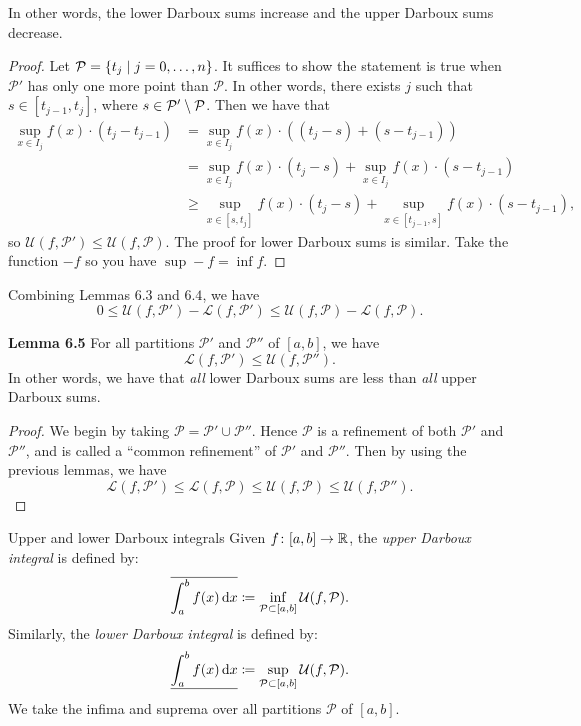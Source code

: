 \documentclass[class=article, crop=false]{standalone}
\begin{document}
  In other words, the lower Darboux sums increase and the upper Darboux sums decrease.
  \begin{proof}
    Let $\mathcal{P} = \left\{t_j\mid j = 0,\dotsc,n\right\}$. It suffices to show the statement is true when $\mathcal{P}'$ has only one more point than $\mathcal{P}$. In other words, there exists $j$ such that $s\in [t_{j - 1}, t_j]$, where $s\in \mathcal{P}'\setminus \mathcal{P}$. Then we have that
    \begin{align*}
      \sup_{x\in I_j} f(x)\cdot (t_j - t_{j - 1}) &= \sup_{x\in I_j} f(x)\cdot ((t_j - s) + (s - t_{j - 1})) \\
                                                  &= \sup_{x\in I_j} f(x)\cdot (t_j - s) + \sup_{x\in I_j} f(x)\cdot (s - t_{j - 1}) \\
                                                  &\geq \sup_{x\in [s, t_j]} f(x)\cdot (t_j - s) + \sup_{x\in [t_{j - 1}, s]} f(x)\cdot (s - t_{j - 1}),
    \end{align*}
    so $\mathcal{U}(f, \mathcal{P}')\leq \mathcal{U}(f, \mathcal{P})$. The proof for lower Darboux sums is similar. Take the function $-f$ so you have $\sup -f = \inf f$.
  \end{proof}
  \begin{note}{}
    Combining Lemmas $6.3$ and $6.4$, we have
    \[
      0\leq \mathcal{U}(f, \mathcal{P}') - \mathcal{L}(f, \mathcal{P}') \leq \mathcal{U}(f, \mathcal{P}) - \mathcal{L}(f, \mathcal{P}).
    \]
  \end{note}
  \textbf{Lemma 6.5} For all partitions $\mathcal{P}'$ and $\mathcal{P}''$ of $[a, b]$, we have
  \[
    \mathcal{L}(f, \mathcal{P}')\leq \mathcal{U}(f, \mathcal{P}'').
  \]
  In other words, we have that \emph{all} lower Darboux sums are less than \emph{all} upper Darboux sums.
  \begin{proof}
    We begin by taking $\mathcal{P} = \mathcal{P}'\cup \mathcal{P}''$. Hence $\mathcal{P}$ is a refinement of both $\mathcal{P}'$ and $\mathcal{P}''$, and is called a ``common refinement'' of $\mathcal{P}'$ and $\mathcal{P}''$. Then by using the previous lemmas, we have
    \[
      \mathcal{L}(f, \mathcal{P}')\leq \mathcal{L}(f, \mathcal{P})\leq \mathcal{U}(f, \mathcal{P})\leq \mathcal{U}(f, \mathcal{P}'').
    \]
  \end{proof}
  \begin{definition}{Upper and lower Darboux integrals}
    Given $f\colon [a, b]\to \mathbb{R}$, the \emph{upper Darboux integral} is defined by:
    \[
      \overline{\int_{a}^{b}f(x) \,\mathrm dx}\coloneqq \inf_{\mathcal{P}\subset [a, b]}\mathcal{U}(f, \mathcal{P}).
    \]
    Similarly, the \emph{lower Darboux integral} is defined by:
    \[
      \underline{\int_{a}^{b}f(x) \,\mathrm dx}\coloneqq \sup_{\mathcal{P}\subset [a, b]}\mathcal{U}(f, \mathcal{P}).
    \]
    We take the infima and suprema over all partitions $\mathcal{P}$ of $[a, b]$.
  \end{definition}
\end{document}
